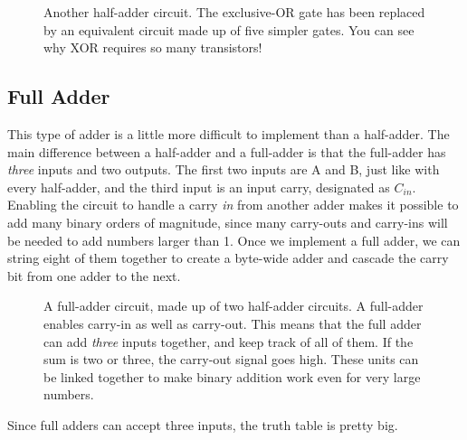 \begin{figure}[!hb]
\begin{center}



\caption{Another half-adder circuit. The exclusive-OR gate has been replaced by an equivalent circuit made up of five simpler gates. You can see why XOR requires so many transistors!}
\end{center}
\end{figure}

\clearpage

\subsection*{Full Adder}

This type of adder is a little more difficult to implement than a half-adder. The main difference between a half-adder and a full-adder is that the full-adder has \emph{three} inputs and two outputs. The first two inputs are A and B, just like with every half-adder, and the third input is an input carry, designated as $C_{in}$. Enabling the circuit to handle a carry \emph{in} from another adder makes it possible to add many binary orders of magnitude, since many carry-outs and carry-ins will be needed to add numbers larger than 1. Once we implement a full adder, we can string eight of them together to create a byte-wide adder and cascade the carry bit from one adder to the next.
\bigskip

\begin{figure}[!hb]
\begin{center}

\caption{A full-adder circuit, made up of two half-adder circuits. A full-adder enables carry-in as well as carry-out. This means that the full adder can add \emph{three} inputs together, and keep track of all of them. If the sum is two or three, the carry-out signal goes high. These units can be linked together to make binary addition work even for very large numbers.}
\end{center}
\end{figure}

Since full adders can accept three inputs, the truth table is pretty big.

